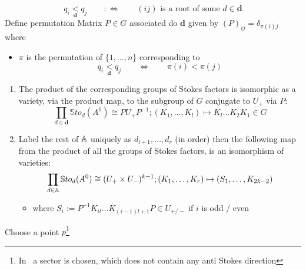 \[
  q_i\underset{\textbf{d}}{<}q_j \qquad :\Leftrightarrow
    \qquad (ij) \text{ is a root of some } d\in\textbf{d}
\]
Define permutation Matrix $P\in G$ associated do $\textbf{d}$ given by
$(P)_{ij}=\delta_{\pi(i)j}$ where
\begin{itemize}
  \item $\pi$ is the permutation of $\{1,\dots,n\}$ corresponding to
  \[
    q_i\underset{\textbf{d}}{<}q_j \qquad \Leftrightarrow \qquad \pi(i)<\pi(j)
  \]
\end{itemize}
\begin{lem}[3.2]
  \begin{enumerate}
    \item The product of the corresponding groups of Stokes factors is
    isomorphic as a variety, via the product map, to the subgroup of $G$
    conjugate to $U_+$ via $P$:
    \[
    \prod_{d\in\textbf{d}}\mathbb{S}to_d(A^0)\cong PU_+P^{-1} ;
    (K_1,\dots,K_l)\mapsto K_l\dots K_2K_1\in G
    \]
    \item Label the rest of $\mathbb{A}$ uniquely as $d_{l+1},\dots,d_r$ (in order)
    then the following map from the product of all the groups of Stokes
    factors, is an isomorphism of varieties:
    \[
    \prod_{d\in\mathbb{A}}\mathbb{S}to_d(A^0)\cong (U_+\times U_-)^{k-1} ;
    (K_1,\dots,K_r)\mapsto (S_1,\dots,K_{2k-2})
    \]
    \begin{itemize}
      \item where $S_i:=P^{-1}K_{il}\dots K_{(i-1)l+1}P\in U_{+/-}$ if $i$ is
      odd / even
    \end{itemize}
  \end{enumerate}
\end{lem}
Choose a point \textcolor{yellow!60!black}{$p$}\footnote{In~\cite{thboalch} a
sector is chosen, which does not contain any anti Stokes direction}
\begin{center}
\end{center}
